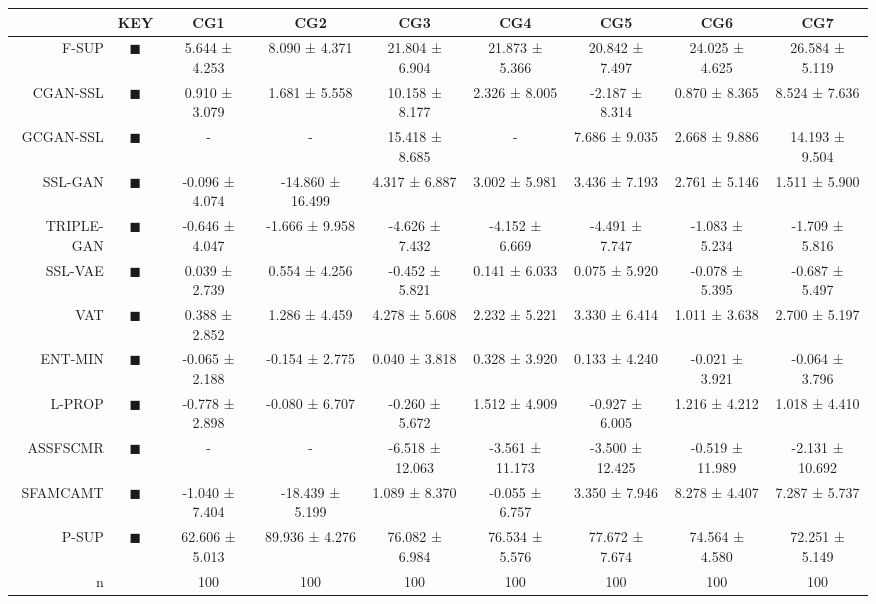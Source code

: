 \begin{tabular}{rcccccccc}
    \toprule
     & KEY & CG1 & CG2 & CG3 & CG4 & CG5 & CG6 & CG7 \\
    \midrule
    F-SUP & \textcolor{FULLY_SUPERVISED_CLASSIFIER}{\LARGE $\blacksquare$} & 5.644 ± 4.253 & 8.090 ± 4.371 & 21.804 ± 6.904 & 21.873 ± 5.366 & 20.842 ± 7.497 & 24.025 ± 4.625 & 26.584 ± 5.119 \\
    CGAN-SSL & \textcolor{CGAN_BASIC_DJ_SUPERVISED_CLASSIFIER}{\LARGE $\blacksquare$} & 0.910 ± 3.079 & 1.681 ± 5.558 & 10.158 ± 8.177 & 2.326 ± 8.005 & -2.187 ± 8.314 & 0.870 ± 8.365 & 8.524 ± 7.636 \\
    GCGAN-SSL & \textcolor{CGAN_GUMBEL_DJ_SUPERVISED_CLASSIFIER}{\LARGE $\blacksquare$} & - & - & 15.418 ± 8.685 & - & 7.686 ± 9.035 & 2.668 ± 9.886 & 14.193 ± 9.504 \\
    SSL-GAN & \textcolor{SSL_GAN}{\LARGE $\blacksquare$} & -0.096 ± 4.074 & -14.860 ± 16.499 & 4.317 ± 6.887 & 3.002 ± 5.981 & 3.436 ± 7.193 & 2.761 ± 5.146 & 1.511 ± 5.900 \\
    TRIPLE-GAN & \textcolor{TRIPLE_GAN}{\LARGE $\blacksquare$} & -0.646 ± 4.047 & -1.666 ± 9.958 & -4.626 ± 7.432 & -4.152 ± 6.669 & -4.491 ± 7.747 & -1.083 ± 5.234 & -1.709 ± 5.816 \\
    SSL-VAE & \textcolor{SSL_VAE}{\LARGE $\blacksquare$} & 0.039 ± 2.739 & 0.554 ± 4.256 & -0.452 ± 5.821 & 0.141 ± 6.033 & 0.075 ± 5.920 & -0.078 ± 5.395 & -0.687 ± 5.497 \\
    VAT & \textcolor{VAT}{\LARGE $\blacksquare$} & 0.388 ± 2.852 & 1.286 ± 4.459 & 4.278 ± 5.608 & 2.232 ± 5.221 & 3.330 ± 6.414 & 1.011 ± 3.638 & 2.700 ± 5.197 \\
    ENT-MIN & \textcolor{ENTROPY_MINIMISATION}{\LARGE $\blacksquare$} & -0.065 ± 2.188 & -0.154 ± 2.775 & 0.040 ± 3.818 & 0.328 ± 3.920 & 0.133 ± 4.240 & -0.021 ± 3.921 & -0.064 ± 3.796 \\
    L-PROP & \textcolor{LABEL_PROPAGATION}{\LARGE $\blacksquare$} & -0.778 ± 2.898 & -0.080 ± 6.707 & -0.260 ± 5.672 & 1.512 ± 4.909 & -0.927 ± 6.005 & 1.216 ± 4.212 & 1.018 ± 4.410 \\
    ASSFSCMR & \textcolor{ASSFSCMR}{\LARGE $\blacksquare$} & - & - & -6.518 ± 12.063 & -3.561 ± 11.173 & -3.500 ± 12.425 & -0.519 ± 11.989 & -2.131 ± 10.692 \\
    SFAMCAMT & \textcolor{SFAMCAMT}{\LARGE $\blacksquare$} & -1.040 ± 7.404 & -18.439 ± 5.199 & 1.089 ± 8.370 & -0.055 ± 6.757 & 3.350 ± 7.946 & 8.278 ± 4.407 & 7.287 ± 5.737 \\
    P-SUP & \textcolor{PARTIAL_SUPERVISED_CLASSIFIER}{\LARGE $\blacksquare$} & 62.606 ± 5.013 & 89.936 ± 4.276 & 76.082 ± 6.984 & 76.534 ± 5.576 & 77.672 ± 7.674 & 74.564 ± 4.580 & 72.251 ± 5.149 \\
    n &  & 100 & 100 & 100 & 100 & 100 & 100 & 100 \\
    \bottomrule
    \end{tabular}
    


